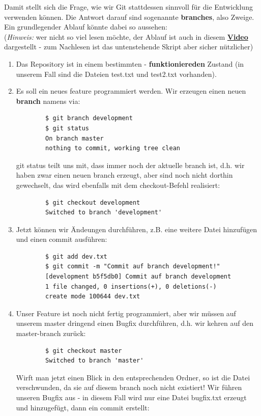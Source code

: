 \documentclass{article}
\begin{document}
Damit stellt sich die Frage, wie wir Git stattdessen sinnvoll für die Entwicklung verwenden können. Die Antwort darauf sind sogenannte \textbf{branches}, also Zweige. \\
Ein grundlegender Ablauf könnte dabei so aussehen: \\
(\textit{Hinweis:} wer nicht so viel lesen möchte, der Ablauf ist auch in diesem \textbf{\href{https://youtu.be/MPvOQzo9XBc}{Video}} dargestellt - zum Nachlesen ist das untenstehende Skript aber sicher nützlicher)
\begin{enumerate}
    \item Das Repository ist in einem bestimmten - \textbf{funktioniereden} Zustand (in unserem Fall sind die Dateien test.txt und test2.txt vorhanden). 
    \item  Es soll ein neues feature programmiert werden. Wir erzeugen einen neuen \textbf{branch} namens  via:
    \begin{verbatim}
        $ git branch development
        $ git status 
        On branch master
        nothing to commit, working tree clean
    \end{verbatim}
    git status teilt uns mit, dass  immer noch der aktuelle branch ist, d.h. wir haben zwar einen neuen branch erzeugt, aber sind noch nicht dorthin gewechselt, das wird ebenfalls mit dem checkout-Befehl realisiert:
    \begin{verbatim}
        $ git checkout development
        Switched to branch 'development'
    \end{verbatim} 
    \item Jetzt können wir Ändeungen durchführen, z.B. eine weitere Datei hinzufügen und einen commit ausführen: 
    \begin{verbatim}
        $ git add dev.txt 
        $ git commit -m "Commit auf branch development!"
        [development b5f5db0] Commit auf branch development
        1 file changed, 0 insertions(+), 0 deletions(-)
        create mode 100644 dev.txt
    \end{verbatim}
    \item Unser Feature ist noch nicht fertig programmiert, aber wir müssen auf unserem master dringend einen Bugfix durchführen, d.h. wir kehren auf den master-branch zurück:
    \begin{verbatim}
        $ git checkout master
        Switched to branch 'master'
    \end{verbatim}
    Wirft man jetzt einen Blick in den entsprechenden Ordner, so ist die Datei  verschwunden, da sie auf diesem branch noch nicht existiert! Wir führen unseren Bugfix aus - in diesem Fall wird nur eine Datei bugfix.txt erzeugt und hinzugefügt, dann ein commit erstellt: 

\end{enumerate}
\end{document}
